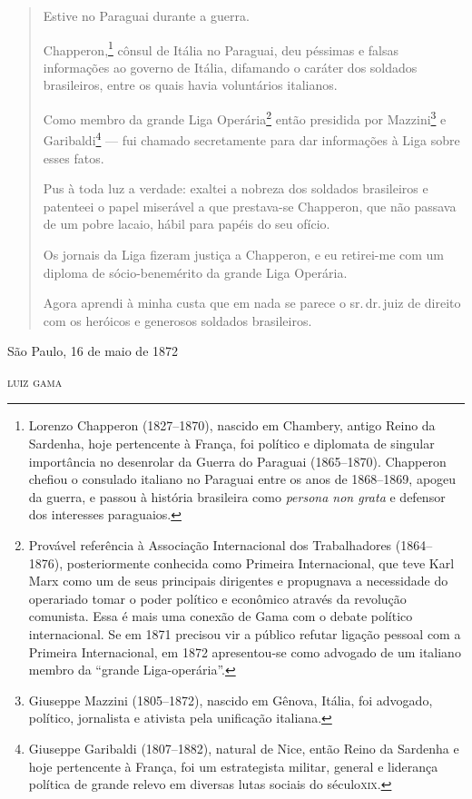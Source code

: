 \begin{quote}
Estive no Paraguai durante a guerra.

Chapperon,\footnote{ Lorenzo Chapperon (1827--1870), nascido em Chambery,
  antigo Reino da Sardenha, hoje pertencente à França, foi político e
  diplomata de singular importância no desenrolar da Guerra do Paraguai
  (1865--1870). Chapperon chefiou o consulado italiano no Paraguai entre
  os anos de 1868--1869, apogeu da guerra, e passou à história brasileira
  como \emph{persona non grata} e defensor dos interesses paraguaios.}
cônsul de Itália no Paraguai, deu péssimas e falsas informações ao
governo de Itália, difamando o caráter dos soldados brasileiros, entre
os quais havia voluntários italianos.

Como membro da grande Liga Operária\footnote{ Provável referência à
  Associação Internacional dos Trabalhadores (1864--1876), posteriormente
  conhecida como Primeira Internacional, que teve Karl Marx como um de
  seus principais dirigentes e propugnava a necessidade do operariado
  tomar o poder político e econômico através da revolução comunista.
  Essa é mais uma conexão de Gama com o debate político internacional.
  Se em 1871 precisou vir a público refutar ligação pessoal com a
  Primeira Internacional, em 1872 apresentou-se como advogado de um
  italiano membro da ``grande Liga-operária''.} então presidida por
Mazzini\footnote{ Giuseppe Mazzini (1805--1872), nascido em Gênova,
  Itália, foi advogado, político, jornalista e ativista pela unificação
  italiana.} e Garibaldi\footnote{ Giuseppe Garibaldi (1807--1882),
  natural de Nice, então Reino da Sardenha e hoje pertencente à França,
  foi um estrategista militar, general e liderança política de grande
  relevo em diversas lutas sociais do século\textsc{xix}.} --- fui chamado
secretamente para dar informações à Liga sobre esses fatos.

Pus à toda luz a verdade: exaltei a nobreza dos soldados brasileiros e
patenteei o papel miserável a que prestava-se Chapperon, que não passava
de um pobre lacaio, hábil para papéis do seu ofício.

Os jornais da Liga fizeram justiça a Chapperon, e eu retirei-me com um
diploma de sócio-benemérito da grande Liga Operária.

Agora aprendi à minha custa que em nada se parece o sr.\,dr.\,juiz de
direito com os heróicos e generosos soldados brasileiros.
\end{quote}

\begin{flushright}
São Paulo, 16 de maio de 1872

\textsc{luiz gama}
\end{flushright}

